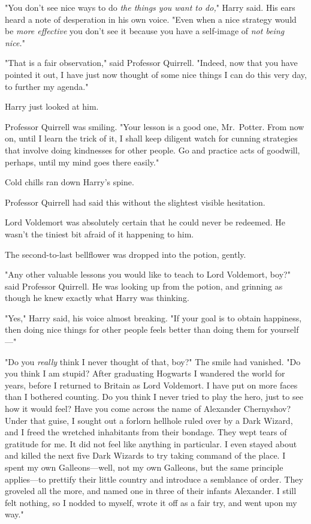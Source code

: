 "You don't see nice ways to do \emph{the things you want to do,}" Harry said.
His ears heard a note of desperation in his own voice. "Even when a nice
strategy would be \emph{more effective} you don't see it because you have a
self-image of \emph{not being nice.}"

"That is a fair observation," said Professor Quirrell. "Indeed, now that you
have pointed it out, I have just now thought of some nice things I can do this
very day, to further my agenda."

Harry just looked at him.

Professor Quirrell was smiling. "Your lesson is a good one, Mr.~Potter. From
now on, until I learn the trick of it, I shall keep diligent watch for cunning
strategies that involve doing kindnesses for other people. Go and practice acts
of goodwill, perhaps, until my mind goes there easily."

Cold chills ran down Harry's spine.

Professor Quirrell had said this without the slightest visible hesitation.

Lord Voldemort was absolutely certain that he could never be redeemed. He
wasn't the tiniest bit afraid of it happening to him.

The second-to-last bellflower was dropped into the potion, gently.

"Any other valuable lessons you would like to teach to Lord Voldemort, boy?"
said Professor Quirrell. He was looking up from the potion, and grinning as
though he knew exactly what Harry was thinking.

"Yes," Harry said, his voice almost breaking. "If your goal is to obtain
happiness, then doing nice things for other people feels better than doing them
for yourself\mbox{---}"

"Do you \emph{really} think I never thought of that, boy?" The smile had
vanished. "Do you think I am stupid? After graduating Hogwarts I wandered the
world for years, before I returned to Britain as Lord Voldemort. I have put on
more faces than I bothered counting. Do you think I never tried to play the
hero, just to see how it would feel? Have you come across the name of Alexander
Chernyshov? Under that guise, I sought out a forlorn hellhole ruled over by a
Dark Wizard, and I freed the wretched inhabitants from their bondage. They wept
tears of gratitude for me. It did not feel like anything in particular. I even
stayed about and killed the next five Dark Wizards to try taking command of the
place. I spent my own Galleons---well, not my own Galleons, but the same
principle applies---to prettify their little country and introduce a semblance
of order. They groveled all the more, and named one in three of their infants
Alexander. I still felt nothing, so I nodded to myself, wrote it off as a fair
try, and went upon my way."

